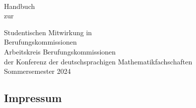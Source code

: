 \frontmatter
{}
\clearpage{} %
\thispagestyle{empty}~
\clearpage{}


\begin{titlepage}
    \begin{flushright}\sffamily
        \vspace*{1cm}
        {\Huge{Handbuch}}\\
        \vspace{2.0cm}
        {\large zur}\smallskip\par
        {\huge{Studentischen Mitwirkung in}\medskip \\
        {\huge Berufungskommissionen}} \\
        \vspace{2ex}
        \vfill
        {\large{Arbeitskreis Berufungskommissionen}\smallskip \\
        {\large{der Konferenz der deutschsprachigen Mathematikfachschaften}}\\
        \vspace{3cm}
        {\Large Sommersemester 2024}}\\
        \vspace{14ex}
    \end{flushright}
\end{titlepage}


\clearpage{}
\vspace*{\fill}
\subsection*{Impressum}

